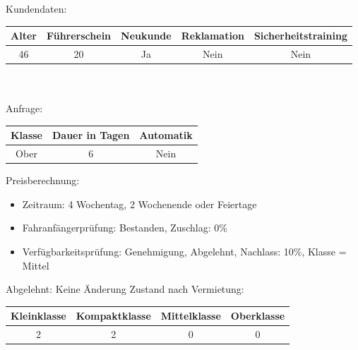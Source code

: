 Kundendaten:\\
\begin{tabular}{|c|c|c|c|c|}
	\hline \textbf{Alter} & \textbf{Führerschein} & \textbf{Neukunde} & \textbf{Reklamation} & \textbf{Sicherheitstraining} \\ 
	\hline 46 & 20 & Ja & Nein & Nein \\ 
	\hline 
\end{tabular} 
\\\\
Anfrage:\\
\begin{tabular}{|c|c|c|}
	\hline \textbf{Klasse} & \textbf{Dauer in Tagen} & \textbf{Automatik} \\ 
	\hline Ober & 6 & Nein \\ 
	\hline 
\end{tabular}

Preisberechnung:
\begin{itemize}
	\item Zeitraum: 4 Wochentag, 2 Wochenende oder Feiertage
	\item Fahranfängerprüfung: Bestanden, Zuschlag: 0\%
	\item Verfügbarkeitsprüfung: Genehmigung, Abgelehnt, Nachlass: 10\%, Klasse = Mittel
	
	
\end{itemize}

Abgelehnt: Keine Änderung
Zustand nach Vermietung:\\
\begin{tabular}{|c|c|c|c|}
	\hline \textbf{Kleinklasse} & \textbf{Kompaktklasse} & \textbf{Mittelklasse} & \textbf{Oberklasse}  \\ 
	\hline 2 & 2 & 0 & 0 \\ 
	\hline 
\end{tabular}

